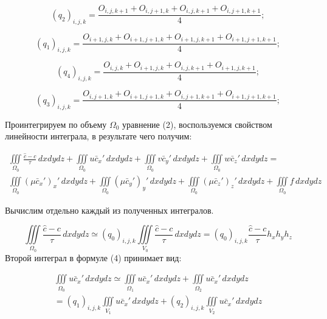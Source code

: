 \documentclass[12pt]{article}
\begin{document}
\begin{equation*}
(q_2)_{i,j,k}=\frac{O_{i,j,k+1}+O_{i,j+1,k}+O_{i,j,k+1}+O_{i,j+1,k+1}}{4};
\end{equation*}

\begin{equation*}
(q_1)_{i,j,k}=\frac{O_{i+1,j,k}+O_{i+1,j+1,k}+O_{i+1,j,k+1}+O_{i+1,j+1,k+1}}{4};
\end{equation*}

\begin{equation*}
(q_4)_{i,j,k}=\frac{O_{i,j,k}+O_{i+1,j,k}+O_{i,j,k+1}+O_{i+1,j,k+1}}{4};
\end{equation*}

\begin{equation*}
(q_3)_{i,j,k}=\frac{O_{i,j+1,k}+O_{i+1,j+1,k}+O_{i,j+1,k+1}+O_{i+1,j+1,k+1}}{4};
\end{equation*}

Проинтегрируем по объему $\Omega_0$ уравнение (2), воспользуемся свойством линейности интеграла, в результате чего получим:

\begin{multline}
\iiint\limits_{\Omega_0} \frac{\hat c - c}{\tau}\,dxdydz + \iiint\limits_{\Omega_0} u\bar{c}_x'\,dxdydz + \iiint\limits_{\Omega_0} v\bar{c}_y'\,dxdydz + \iiint\limits_{\Omega_0} w\bar{c}_z'\,dxdydz = \\
\iiint\limits_{\Omega_0} (\mu\bar{c}_x')_x'\,dxdydz + \iiint\limits_{\Omega_0} (\mu\bar{c}_y')_y'\,dxdydz + \iiint\limits_{\Omega_0} (\mu\bar{c}_z')_z'\,dxdydz + \iiint\limits_{\Omega_0} f\,dxdydz  
\end{multline}

Вычислим отдельно каждый из полученных интегралов.

\begin{equation}
	\iiint\limits_{\Omega_0} \frac{\hat c - c}{\tau}\,dxdydz \simeq (q_0)_{i,j,k}\iiint\limits_{V_0} \frac{\hat c - c}{\tau}\,dxdydz = (q_0)_{i,j,k}\frac{\hat c - c}{\tau}h_xh_yh_z
\end{equation}
Второй интеграл в формуле (4) принимает вид:

\begin{multline*}
\iiint\limits_{\Omega_0} u\bar{c}_x'\,dxdydz \simeq \iiint\limits_{\Omega_1} u\bar{c}_x'\,dxdydz + \iiint\limits_{\Omega_2} u\bar{c}_x'\,dxdydz \\  
= (q_1)_{i,j,k}\iiint\limits_{V_1} u\bar{c}_x'\,dxdydz + (q_2)_{i,j,k}\iiint\limits_{V_2} u\bar{c}_x'\,dxdydz
\end{multline*}
\end{document}
